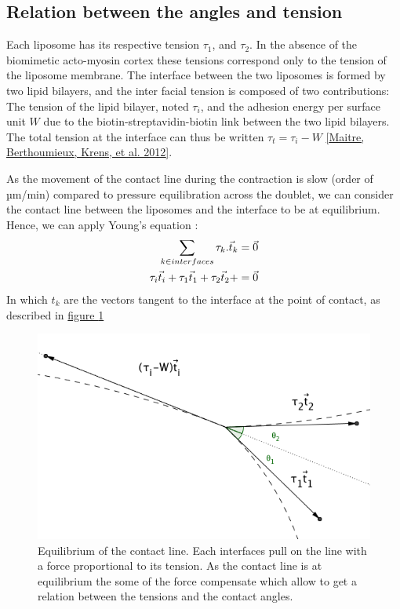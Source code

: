\documentclass[A4paperpaper,11pt,english]{sphinxmanual}
\begin{document}
\subsection{Relation between the angles and tension}
\label{parts/part4:relation-between-the-angles-and-tension}
Each liposome has its respective tension \(\tau_1\), and \(\tau_2\).  In the absence
of the biomimetic acto-myosin cortex these tensions correspond only to the
tension of the liposome membrane. The interface between the two liposomes is
formed by two lipid bilayers, and the inter facial tension is composed of two contributions:
The tension of the lipid bilayer, noted \(\tau_i\), and the
adhesion energy per surface unit \(W\) due to the biotin-streptavidin-biotin link
between the two lipid bilayers. The total tension at the interface can thus be
written \(\tau_t = \tau_i -W\) {\hyperref[parts/part4:maitre2012]{{[}Maitre, Berthoumieux, Krens,  et al.  2012{]}}}.

As the movement of the contact line during the contraction is slow (order of
µm/min) compared to pressure equilibration across the doublet, we can consider
the contact line between the liposomes and the interface to be at equilibrium.
Hence, we can apply Young's equation :
\begin{gather}
\begin{split}\sum_{k \in interfaces} \tau_k. \vec t_k  = \vec 0 \\
\tau_i \vec t_i + \tau_1 \vec t_1 + \tau_2 \vec t_2 + = \vec 0\end{split}\notag
\end{gather}
In which \(t_k\) are the vectors tangent to the interface at the point of
contact, as described in \hyperref[parts/part4:fig-yd]{figure  \ref*{parts/part4:fig-yd}}
\begin{figure}[htbp]
\centering
\capstart

\includegraphics[width=0.600\linewidth]{yd.png}
\caption{Equilibrium of the contact line. Each interfaces pull on the line with a
force proportional to its tension. As the contact line is at equilibrium
the some of the force compensate which allow to get a relation between the
tensions and the contact angles.}\label{parts/part4:fig-yd}\end{figure}
\end{document}
